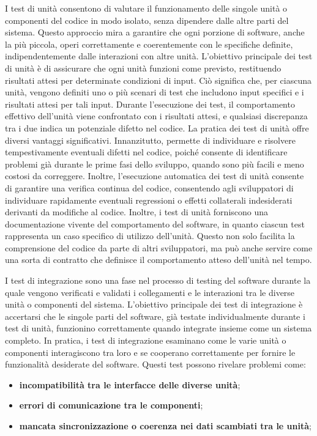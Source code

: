 I test di unità consentono di valutare il funzionamento delle singole unità o componenti del codice in modo isolato, senza dipendere dalle altre parti del sistema. Questo approccio mira a garantire che ogni porzione di software, anche la più piccola, operi correttamente e coerentemente con le specifiche definite, indipendentemente dalle interazioni con altre unità.
L'obiettivo principale dei test di unità è di assicurare che ogni unità funzioni come previsto, restituendo risultati attesi per determinate condizioni di input. Ciò significa che, per ciascuna unità, vengono definiti uno o più scenari di test che includono input specifici e i risultati attesi per tali input. Durante l'esecuzione dei test, il comportamento effettivo dell'unità viene confrontato con i risultati attesi, e qualsiasi discrepanza tra i due indica un potenziale difetto nel codice.
La pratica dei test di unità offre diversi vantaggi significativi. Innanzitutto, permette di individuare e risolvere tempestivamente eventuali difetti nel codice, poiché consente di identificare problemi già durante le prime fasi dello sviluppo, quando sono più facili e meno costosi da correggere. Inoltre, l'esecuzione automatica dei test di unità consente di garantire una verifica continua del codice, consentendo agli sviluppatori di individuare rapidamente eventuali regressioni o effetti collaterali indesiderati derivanti da modifiche al codice.
Inoltre, i test di unità forniscono una documentazione vivente del comportamento del software, in quanto ciascun test rappresenta un caso specifico di utilizzo dell'unità. Questo non solo facilita la comprensione del codice da parte di altri sviluppatori, ma può anche servire come una sorta di contratto che definisce il comportamento atteso dell'unità nel tempo.

I test di integrazione sono una fase nel processo di testing del software durante la quale vengono verificati e validati i collegamenti e le interazioni tra le diverse unità o componenti del sistema. L'obiettivo principale dei test di integrazione è accertarsi che le singole parti del software, già testate individualmente durante i test di unità, funzionino correttamente quando integrate insieme come un sistema completo. In pratica, i test di integrazione esaminano come le varie unità o componenti interagiscono tra loro e se cooperano correttamente per fornire le funzionalità desiderate del software. Questi test possono rivelare problemi come:
\begin{itemize}
	\item \textbf{incompatibilità tra le interfacce delle diverse unità};
	\item \textbf{errori di comunicazione tra le componenti};
	\item \textbf{mancata sincronizzazione o coerenza nei dati scambiati tra le unità};
\end{itemize}

